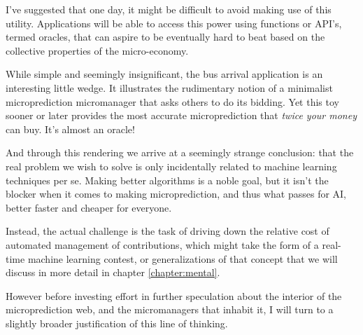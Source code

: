 I've suggested that one day, it might be difficult to avoid making use of this utility. Applications will be able to access this power using functions or API's, termed oracles, that can aspire to be eventually hard to beat based on the collective properties of the micro-economy. 


While simple and seemingly insignificant, the bus arrival application is an interesting little wedge. It illustrates the rudimentary notion of a minimalist microprediction micromanager that asks others to do its bidding. Yet this toy sooner or later provides the most accurate microprediction that {\em twice your money} can buy. It's almost an oracle! 

And through this rendering we arrive at a seemingly strange conclusion: that the real problem we wish to solve is only incidentally related to machine learning techniques per se. Making better algorithms is a noble goal, but it isn't the blocker when it comes to making microprediction, and thus what passes for AI, better faster and cheaper for everyone.  

Instead, the actual challenge is the task of driving down the relative cost of automated management of contributions, which might take the form of a real-time machine learning contest, or generalizations of that concept that we will discuss in more detail in chapter \ref{chapter:mental}. 

However before investing effort in further speculation about the interior of the microprediction web, and the micromanagers that inhabit it, I will turn to a slightly broader justification of this line of thinking. 


   





















